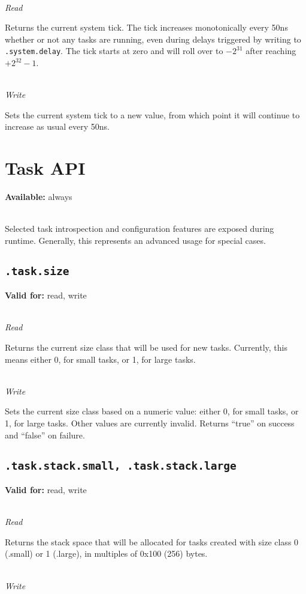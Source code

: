 \documentclass{article}
\begin{document}
~\\
\textit{Read}

Returns the current system tick. The tick increases monotonically every 50ns whether or not any tasks are running, even during delays triggered by writing to \texttt{.system.delay}. The tick starts at zero and will roll over to $-2^{31}$ after reaching $+2^{32}-1$.

~\\
\textit{Write}

Sets the current system tick to a new value, from which point it will continue to increase as usual every 50ns.

\section{Task API}
\textbf{Available:} always

~\\
Selected task introspection and configuration features are exposed during runtime. Generally, this represents an advanced usage for special cases.

\subsection{\texttt{.task.size}}
\textbf{Valid for:} read, write

~\\
\textit{Read}

Returns the current size class that will be used for new tasks. Currently, this means either 0, for small tasks, or 1, for large tasks.

~\\
\textit{Write}

Sets the current size class based on a numeric value: either 0, for small tasks, or 1, for large tasks. Other values are currently invalid.
Returns ``true'' on success and ``false'' on failure.

\subsection{\texttt{.task.stack.small, .task.stack.large}}
\textbf{Valid for:} read, write

~\\
\textit{Read}

Returns the stack space that will be allocated for tasks created with size class 0 (.small) or 1 (.large), in multiples of 0x100 (256) bytes.

~\\
\textit{Write}
\end{document}
